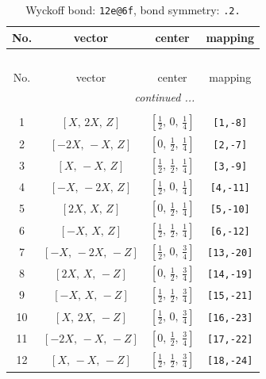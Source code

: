 \documentclass[fleqn,8pt]{jsarticle}
\begin{document}
\renewcommand{\arraystretch}{1.2}
\begin{longtable}{cccc}
\caption{Wyckoff bond: {\tt 12e@6f}, bond symmetry: {\tt .2.}}
 \\
 \hline \hline
No. & vector & center & mapping \\ \hline \endfirsthead

\multicolumn{3}{l}{\tablename\ \thetable{}} \\
 \hline \hline
No. & vector & center & mapping \\ \hline \endhead

 \hline \hline
\multicolumn{3}{r}{\footnotesize\it continued ...} \\ \endfoot

 \hline \hline
\multicolumn{3}{r}{} \\ \endlastfoot

1 & $\left[ X,\, 2 X,\, Z \right]$ & $\left[ \frac{1}{2},\, 0,\, \frac{1}{4} \right]$ & {\tt [1,-8]} \\ \hline
2 & $\left[ - 2 X,\, - X,\, Z \right]$ & $\left[ 0,\, \frac{1}{2},\, \frac{1}{4} \right]$ & {\tt [2,-7]} \\ \hline
3 & $\left[ X,\, - X,\, Z \right]$ & $\left[ \frac{1}{2},\, \frac{1}{2},\, \frac{1}{4} \right]$ & {\tt [3,-9]} \\ \hline
4 & $\left[ - X,\, - 2 X,\, Z \right]$ & $\left[ \frac{1}{2},\, 0,\, \frac{1}{4} \right]$ & {\tt [4,-11]} \\ \hline
5 & $\left[ 2 X,\, X,\, Z \right]$ & $\left[ 0,\, \frac{1}{2},\, \frac{1}{4} \right]$ & {\tt [5,-10]} \\ \hline
6 & $\left[ - X,\, X,\, Z \right]$ & $\left[ \frac{1}{2},\, \frac{1}{2},\, \frac{1}{4} \right]$ & {\tt [6,-12]} \\ \hline
7 & $\left[ - X,\, - 2 X,\, - Z \right]$ & $\left[ \frac{1}{2},\, 0,\, \frac{3}{4} \right]$ & {\tt [13,-20]} \\ \hline
8 & $\left[ 2 X,\, X,\, - Z \right]$ & $\left[ 0,\, \frac{1}{2},\, \frac{3}{4} \right]$ & {\tt [14,-19]} \\ \hline
9 & $\left[ - X,\, X,\, - Z \right]$ & $\left[ \frac{1}{2},\, \frac{1}{2},\, \frac{3}{4} \right]$ & {\tt [15,-21]} \\ \hline
10 & $\left[ X,\, 2 X,\, - Z \right]$ & $\left[ \frac{1}{2},\, 0,\, \frac{3}{4} \right]$ & {\tt [16,-23]} \\ \hline
11 & $\left[ - 2 X,\, - X,\, - Z \right]$ & $\left[ 0,\, \frac{1}{2},\, \frac{3}{4} \right]$ & {\tt [17,-22]} \\ \hline
12 & $\left[ X,\, - X,\, - Z \right]$ & $\left[ \frac{1}{2},\, \frac{1}{2},\, \frac{3}{4} \right]$ & {\tt [18,-24]} \\
\end{longtable}
\end{document}
